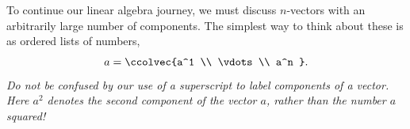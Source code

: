\chapter{\vectorsInSpaceTitle}
\label{vectorsinspace}

%

%
%

To continue our linear algebra journey, we must discuss $n$-vectors with an arbitrarily large number of components. 
The simplest way to think about these is as  ordered  lists of numbers, 
\[a=\ccolvec{a^1 \\ \vdots \\ a^n } .\]
%
\noindent
{\itshape 
Do not be confused by our use of a superscript to label components of a vector. Here $a^2$ denotes
the second component of the vector $a$, rather than the number $a$ squared!}  

